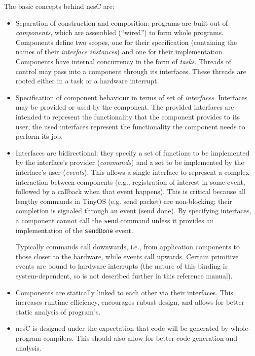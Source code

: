 \documentclass[11pt]{article}
\newcommand{\code}[1]{{\tt #1}}
\newcommand{\nesc}{nesC\xspace}
\begin{document}
The basic concepts behind \nesc are:
\begin{itemize}
\item Separation of construction and composition: programs are built out of
\emph{components}, which are assembled (``wired'') to form whole
programs. Components define two scopes, one for their specification
(containing the names of their \emph{interface instances}) and one for
their implementation. Components have internal concurrency in the form of
\emph{tasks}. Threads of control may pass into a component through its
interfaces. These threads are rooted either in a task or a hardware
interrupt.

\item Specification of component behaviour in terms of set of
\emph{interfaces}. Interfaces may be provided or used by the component. The
provided interfaces are intended to represent the functionality that the
component provides to its user, the used interfaces represent the
functionality the component needs to perform its job.

\item Interfaces are bidirectional: they specify a set of functions to be
implemented by the interface's provider (\emph{commands}) and a set to be
implemented by the interface's user (\emph{events}). This allows a single
interface to represent a complex interaction between components (e.g.,
registration of interest in some event, followed by a callback when
that event happens). This is critical because all lengthy commands in
TinyOS (e.g. send packet) are non-blocking; their completion is
signaled through an event (send done). By specifying interfaces, a
component cannot call the \code{send} command unless it provides an
implementation of the \code{sendDone} event.

Typically commands call downwards, i.e., from application components to
those closer to the hardware, while events call upwards. Certain primitive
events are bound to hardware interrupts (the nature of this binding is
system-dependent, so is not described further in this reference manual).

\item Components are statically linked to each other via their interfaces.
This increases runtime efficiency, encourages rubust design, and allows for
better static analysis of program's.

\item \nesc is designed under the expectation that code will be generated
by whole-program compilers. This should also allow for better code 
generation and analysis.
\end{itemize}
\end{document}
